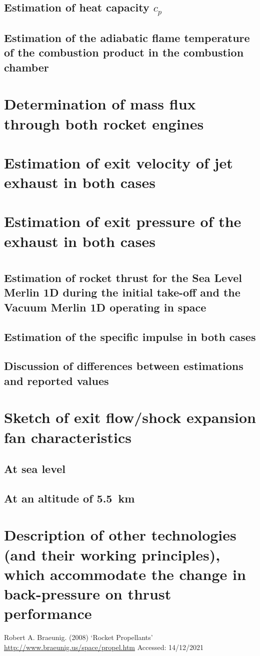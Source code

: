\documentclass[11pt]{article}
\numberwithin{equation}{section}
\begin{document}
\subsection{Estimation of heat capacity $c_p$}
\subsection{Estimation of the adiabatic flame temperature of the combustion product in the combustion chamber}
\section{Determination of mass flux through both rocket engines}
\section{Estimation of exit velocity of jet exhaust in both cases}
\section{Estimation of exit pressure of the exhaust in both cases}
\section{}
\subsection{Estimation of  rocket thrust for the Sea Level Merlin 1D during the initial take-off and the Vacuum Merlin 1D operating in space}
\subsection{Estimation of the specific impulse in both cases}
\subsection{Discussion of differences between estimations and reported values}
\section{Sketch of exit flow/shock expansion fan characteristics}
\subsection{At sea level}
\subsection{At an altitude of \SI{5.5}{\kilo\meter}}
\section{Description of other technologies (and their working principles), which accommodate the change in back-pressure on thrust performance}
\begin{thebibliography}{00}
     Robert A. Braeunig. (2008) `Rocket Propellants' \url{http://www.braeunig.us/space/propel.htm} Accessed: 14/12/2021
\end{thebibliography}
\end{document}
